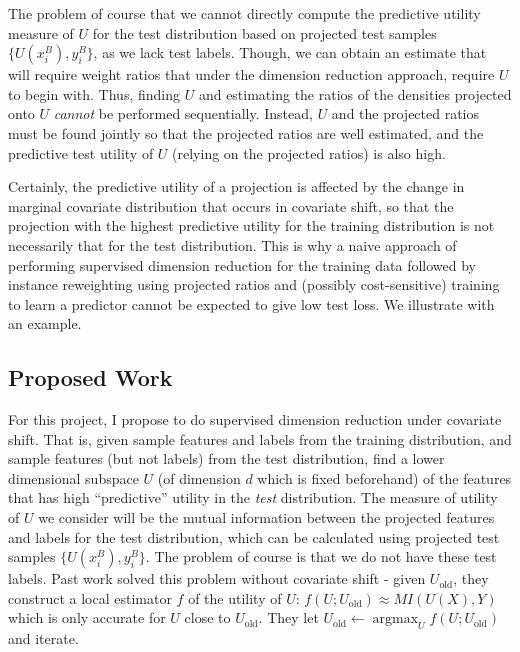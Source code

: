\documentclass[8pt]{article}
\begin{document}
The problem of course that we
cannot directly compute the predictive utility measure of $U$ for the test
distribution based on
projected test samples $\{U(x_i^B),y_i^B\}$, as we lack test
labels. Though, we can obtain an
estimate that will require weight ratios that under the dimension reduction approach, require $U$ to begin with.
Thus, finding $U$ and estimating the ratios of the densities
projected onto $U$ \emph{cannot} be performed sequentially.  Instead, $U$ and
the projected ratios must be found jointly
so that the projected ratios are well estimated, and the predictive
test utility of $U$ (relying on the projected ratios)
is also high.

Certainly, the predictive utility of a projection is affected by the
change in
marginal covariate distribution that occurs in covariate shift, so
that the projection with the highest predictive utility for the
training distribution is not necessarily that for the test
distribution.  This is why a naive approach of performing supervised
dimension reduction for the training data followed by instance
reweighting using projected ratios and (possibly cost-sensitive)
training to learn a predictor cannot be expected to give low test
loss.  We illustrate with an example.

\subsection{Proposed Work}
For this project, I propose to do supervised dimension reduction under
covariate shift.  That is, given sample features and labels from the
training distribution, and sample features (but not labels) from the
test distribution, find a lower dimensional subspace $U$ (of dimension
$d$ which is fixed beforehand) of the
features that has high ``predictive'' utility in the \emph{test}
distribution.  The measure of utility of $U$ we consider will be the mutual
information between the projected features and labels for the test
distribution, which can be calculated using projected test samples
$\{U(x_i^B),y_i^B\}$.  The problem of course is that we do not have
these test labels.  Past work \cite{suzuki2013sufficient} solved this
problem without covariate shift - given $U_{\operatorname{old}}$, they
construct a local estimator $f$ of the utility of $U$:
$f(U;U_{\operatorname{old}}) \approx MI(U(X),Y)$ which is only
accurate for $U$ close to $U_{\operatorname{old}}$.  They let $U_{\operatorname{old}}
\leftarrow \operatorname{argmax}_U f(U;U_{\operatorname{old}})$ and iterate.
\end{document}
